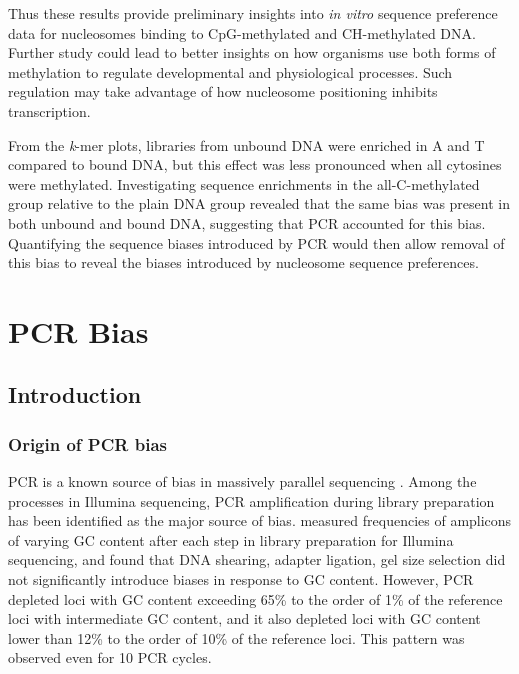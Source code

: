 \documentclass[parskip=full, numbers=noenddot]{scrreprt}
\begin{document}
Thus these results provide preliminary insights into \emph{in vitro} sequence preference data for nucleosomes binding to CpG-methylated and CH-methylated DNA.  Further study could lead to better insights on how organisms use both forms of methylation to regulate developmental and physiological processes.  Such regulation may take advantage of how nucleosome positioning inhibits transcription.

From the \emph{k}-mer plots, libraries from unbound DNA were enriched in A and T compared to bound DNA, but this effect was less pronounced when all cytosines were methylated.  Investigating sequence enrichments in the all-C-methylated group relative to the plain DNA group revealed that the same bias was present in both unbound and bound DNA, suggesting that PCR accounted for this bias.  Quantifying the sequence biases introduced by PCR would then allow removal of this bias to reveal the biases introduced by nucleosome sequence preferences.

\chapter{PCR Bias}
\label{ch:pcrbias}

\section{Introduction}
\label{sec:pcrbias_intro}

\subsection{Origin of PCR bias}
\label{ssec:pcrbias_intro_origin}

PCR is a known source of bias in massively parallel sequencing \citep{olova_comparison_2018}.  Among the processes in Illumina sequencing, PCR amplification during library preparation has been identified as the major source of bias.
\citet{aird_analyzing_2011} measured frequencies of amplicons of varying GC content after each step in library preparation for Illumina sequencing, and found that DNA shearing, adapter ligation, gel size selection did not significantly introduce biases in response to GC content.  However, PCR depleted loci with GC content exceeding 65\% to the order of 1\% of the reference loci with intermediate GC content, and it also depleted loci with GC content lower than 12\% to the order of 10\% of the reference loci.  This pattern was observed even for 10 PCR cycles.
\end{document}

